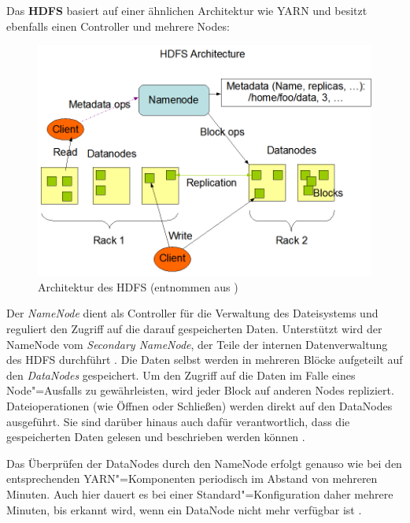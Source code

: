 Das \textbf{\gls{HDFS}} basiert auf einer ähnlichen Architektur wie \gls{YARN} und besitzt ebenfalls einen Controller und mehrere Nodes:

\begin{figure}[h]
    \includegraphics{./resources/hdfsarchitecture.png}
    \caption[Architektur des HDFS]
    {Architektur des \acrshort{HDFS} (entnommen aus \cite{HadoopHdfsDesc271})}
    \label{fig:hdfsarch}
\end{figure}

Der \emph{NameNode} dient als Controller für die Verwaltung des Dateisystems und reguliert den Zugriff auf die darauf gespeicherten Daten.
Unterstützt wird der NameNode vom \emph{Secondary NameNode}, der Teile der internen Datenverwaltung des \gls{HDFS} durchführt \cite{HadoopHdfsGuide271}.
Die Daten selbst werden in mehreren Blöcke aufgeteilt auf den \emph{DataNodes} gespeichert.
Um den Zugriff auf die Daten im Falle eines Node"=Ausfalls zu gewährleisten, wird jeder Block auf anderen Nodes repliziert.
Dateioperationen (wie Öffnen oder Schließen) werden direkt auf den DataNodes ausgeführt.
Sie sind darüber hinaus auch dafür verantwortlich, dass die gespeicherten Daten gelesen und beschrieben werden können \cite{Shvachko2010,HadoopHdfsDesc271}.

Das Überprüfen der DataNodes durch den NameNode erfolgt genauso wie bei den entsprechenden \gls{YARN}"=Komponenten periodisch im Abstand von mehreren Minuten.
Auch hier dauert es bei einer Standard"=Konfiguration daher mehrere Minuten, bis erkannt wird, wenn ein DataNode nicht mehr verfügbar ist \cite{HadoopHdfsConfig271}.

